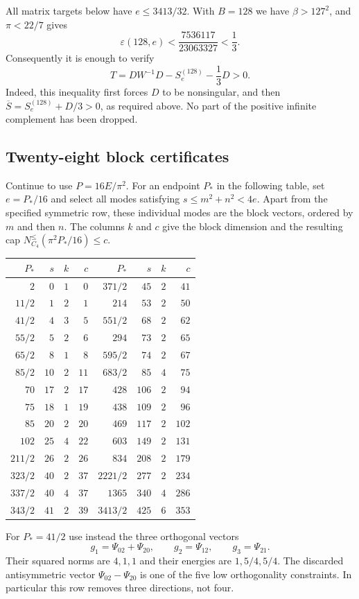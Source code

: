 \documentclass[11pt,reqno]{amsart}
\numberwithin{equation}{section}
\begin{document}
All matrix targets below have $e\le3413/32$. With $B=128$ we have
$\beta>127^2$, and $\pi<22/7$ gives
\begin{equation}
 \varepsilon(128,e)
 <\frac{7536117}{23063327}<\frac13.
 \label{df:one-third-tail}
\end{equation}
Consequently it is enough to verify
\begin{equation}
 T=DW^{-1}D-S_e^{(128)}-\frac13D>0.
 \label{df:finite-matrix}
\end{equation}
Indeed, this inequality first forces $D$ to be nonsingular, and then
$\overline S=S_e^{(128)}+D/3>0$, as required above.
No part of the positive infinite complement has been dropped.

\subsection{Twenty-eight block certificates}

Continue to use $P=16E/\pi^2$. For an endpoint $P_*$ in the following
table, set $e=P_*/16$ and select all modes satisfying
$s\le m^2+n^2<4e$. Apart from the specified symmetric row, these
individual modes are the block vectors, ordered by $m$ and then $n$.
The columns $k$ and $c$ give the block dimension and the resulting cap
$N_{C_4}^{\le}(\pi^2P_*/16)\le c$.
\begin{center}
\begin{tabular}{r|r|r|r@{\qquad}r|r|r|r}
$P_*$&$s$&$k$&$c$&$P_*$&$s$&$k$&$c$\\ \hline
$2$&$0$&$1$&$0$&$371/2$&$45$&$2$&$41$\\
$11/2$&$1$&$2$&$1$&$214$&$53$&$2$&$50$\\
$41/2$&$4$&$3$&$5$&$551/2$&$68$&$2$&$62$\\
$55/2$&$5$&$2$&$6$&$294$&$73$&$2$&$65$\\
$65/2$&$8$&$1$&$8$&$595/2$&$74$&$2$&$67$\\
$85/2$&$10$&$2$&$11$&$683/2$&$85$&$4$&$75$\\
$70$&$17$&$2$&$17$&$428$&$106$&$2$&$94$\\
$75$&$18$&$1$&$19$&$438$&$109$&$2$&$96$\\
$85$&$20$&$2$&$20$&$469$&$117$&$2$&$102$\\
$102$&$25$&$4$&$22$&$603$&$149$&$2$&$131$\\
$211/2$&$26$&$2$&$26$&$834$&$208$&$2$&$179$\\
$323/2$&$40$&$2$&$37$&$2221/2$&$277$&$2$&$234$\\
$337/2$&$40$&$4$&$37$&$1365$&$340$&$4$&$286$\\
$343/2$&$41$&$2$&$39$&$3413/2$&$425$&$6$&$353$
\end{tabular}
\end{center}
For $P_*=41/2$ use instead the three orthogonal vectors
\[
 g_1=\Psi_{02}+\Psi_{20},\qquad g_2=\Psi_{12},\qquad g_3=\Psi_{21}.
\]
Their squared norms are $4,1,1$ and their energies are $1,5/4,5/4$.
The discarded antisymmetric vector $\Psi_{02}-\Psi_{20}$ is one of
the five low orthogonality constraints. In particular this row removes
three directions, not four.
\end{document}

